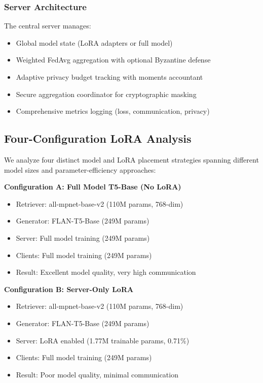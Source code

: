 \documentclass[conference]{IEEEtran}
\begin{document}
\subsubsection{Server Architecture}
The central server manages:
\begin{itemize}
    \item Global model state (LoRA adapters or full model)
    \item Weighted FedAvg aggregation with optional Byzantine defense
    \item Adaptive privacy budget tracking with moments accountant
    \item Secure aggregation coordinator for cryptographic masking
    \item Comprehensive metrics logging (loss, communication, privacy)
\end{itemize}

\subsection{Four-Configuration LoRA Analysis}

We analyze four distinct model and LoRA placement strategies spanning different model sizes and parameter-efficiency approaches:

\textbf{Configuration A: Full Model T5-Base (No LoRA)}
\begin{itemize}
    \item Retriever: all-mpnet-base-v2 (110M params, 768-dim)
    \item Generator: FLAN-T5-Base (249M params)
    \item Server: Full model training (249M params)
    \item Clients: Full model training (249M params)
    \item Result: Excellent model quality, very high communication
\end{itemize}

\textbf{Configuration B: Server-Only LoRA}
\begin{itemize}
    \item Retriever: all-mpnet-base-v2 (110M params, 768-dim)
    \item Generator: FLAN-T5-Base (249M params)
    \item Server: LoRA enabled (1.77M trainable params, 0.71\%)
    \item Clients: Full model training (249M params)
    \item Result: Poor model quality, minimal communication
\end{itemize}
\end{document}
